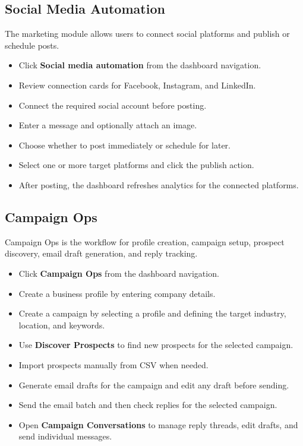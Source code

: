\subsection{Social Media Automation}
The marketing module allows users to connect social platforms and publish or schedule posts.
\begin{itemize}
    \item Click \textbf{Social media automation} from the dashboard navigation.
    \item Review connection cards for Facebook, Instagram, and LinkedIn.
    \item Connect the required social account before posting.
    \item Enter a message and optionally attach an image.
    \item Choose whether to post immediately or schedule for later.
    \item Select one or more target platforms and click the publish action.
    \item After posting, the dashboard refreshes analytics for the connected platforms.
\end{itemize}

\subsection{Campaign Ops}
Campaign Ops is the workflow for profile creation, campaign setup, prospect discovery, email draft generation, and reply tracking.
\begin{itemize}
    \item Click \textbf{Campaign Ops} from the dashboard navigation.
    \item Create a business profile by entering company details.
    \item Create a campaign by selecting a profile and defining the target industry, location, and keywords.
    \item Use \textbf{Discover Prospects} to find new prospects for the selected campaign.
    \item Import prospects manually from CSV when needed.
    \item Generate email drafts for the campaign and edit any draft before sending.
    \item Send the email batch and then check replies for the selected campaign.
    \item Open \textbf{Campaign Conversations} to manage reply threads, edit drafts, and send individual messages.
\end{itemize}

